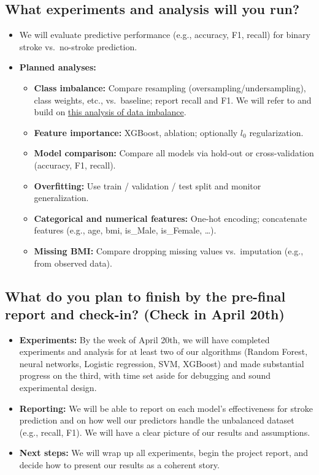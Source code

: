 \documentclass[11pt,a4paper]{article}
\begin{document}
\subsection*{What experiments and analysis will you run?}
\begin{itemize}[leftmargin=*]
  \item We will evaluate predictive performance (e.g., accuracy, F1, recall) for binary stroke vs.\ no-stroke prediction.
  \item \textbf{Planned analyses:}
  \begin{itemize}
    \item \textbf{Class imbalance:} Compare resampling (oversampling/undersampling), class weights, etc., vs.\ baseline; report recall and F1. We will refer to and build on \href{https://hemostasistoday.com/insight/favour-kpokpe-32544}{this analysis of data imbalance}.
    \item \textbf{Feature importance:} XGBoost, ablation; optionally $l_0$ regularization.
    \item \textbf{Model comparison:} Compare all models via hold-out or cross-validation (accuracy, F1, recall).
    \item \textbf{Overfitting:} Use train / validation / test split and monitor generalization.
    \item \textbf{Categorical and numerical features:} One-hot encoding; concatenate features (e.g., age, bmi, is\_Male, is\_Female, \ldots).
    \item \textbf{Missing BMI:} Compare dropping missing values vs.\ imputation (e.g., from observed data).
  \end{itemize}
\end{itemize}

\subsection*{What do you plan to finish by the pre-final report and check-in? (Check in April 20th)}
\begin{itemize}[leftmargin=*]
  \item \textbf{Experiments:} By the week of April 20th, we will have completed experiments and analysis for at least two of our algorithms (Random Forest, neural networks, Logistic regression, SVM, XGBoost) and made substantial progress on the third, with time set aside for debugging and sound experimental design.
  \item \textbf{Reporting:} We will be able to report on each model's effectiveness for stroke prediction and on how well our predictors handle the unbalanced dataset (e.g., recall, F1). We will have a clear picture of our results and assumptions.
  \item \textbf{Next steps:} We will wrap up all experiments, begin the project report, and decide how to present our results as a coherent story.
\end{itemize}
\end{document}
